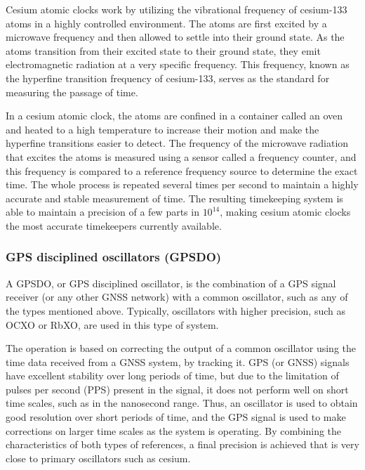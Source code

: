 Cesium atomic clocks work by utilizing the vibrational frequency of cesium-133 atoms in a highly controlled environment. The atoms are first excited by a microwave frequency and then allowed to settle into their ground state. As the atoms transition from their excited state to their ground state, they emit electromagnetic radiation at a very specific frequency. This frequency, known as the hyperfine transition frequency of cesium-133, serves as the standard for measuring the passage of time.

In a cesium atomic clock, the atoms are confined in a container called an oven and heated to a high temperature to increase their motion and make the hyperfine transitions easier to detect. The frequency of the microwave radiation that excites the atoms is measured using a sensor called a frequency counter, and this frequency is compared to a reference frequency source to determine the exact time. The whole process is repeated several times per second to maintain a highly accurate and stable measurement of time. The resulting timekeeping system is able to maintain a precision of a few parts in $10^{14}$, making cesium atomic clocks the most accurate timekeepers currently available.



\subsubsection{GPS disciplined oscillators (GPSDO)}

A GPSDO, or GPS disciplined oscillator, is the combination of a GPS signal receiver (or any other GNSS network) with a common oscillator, such as any of the types mentioned above. Typically, oscillators with higher precision, such as OCXO or RbXO, are used in this type of system.

The operation is based on correcting the output of a common oscillator using the time data received from a GNSS system, by tracking it. GPS (or GNSS) signals have excellent stability over long periods of time, but due to the limitation of pulses per second (PPS) present in the signal, it does not perform well on short time scales, such as in the nanosecond range. Thus, an oscillator is used to obtain good resolution over short periods of time, and the GPS signal is used to make corrections on larger time scales as the system is operating. By combining the characteristics of both types of references, a final precision is achieved that is very close to primary oscillators such as cesium.

